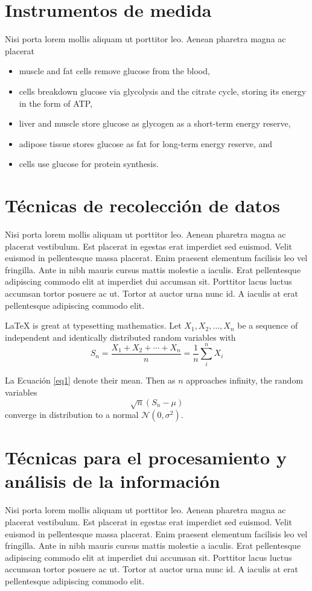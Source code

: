 \section{Instrumentos de medida}
Nisi porta lorem mollis aliquam ut porttitor leo. Aenean pharetra magna ac placerat \begin{itemize}
	\item muscle and fat cells remove glucose from the blood,
	\item cells breakdown glucose via glycolysis and the citrate cycle, storing its energy in the form of ATP,
	\item liver and muscle store glucose as glycogen as a short-term energy reserve,
	\item adipose tissue stores glucose as fat for long-term energy reserve, and
	\item cells use glucose for protein synthesis.
\end{itemize}

\section{Técnicas de recolección de datos}
Nisi porta lorem mollis aliquam ut porttitor leo. Aenean pharetra magna ac placerat vestibulum. Est placerat in egestas erat imperdiet sed euismod. Velit euismod in pellentesque massa placerat. Enim praesent elementum facilisis leo vel fringilla. Ante in nibh mauris cursus mattis molestie a iaculis. Erat pellentesque adipiscing commodo elit at imperdiet dui accumsan sit. Porttitor lacus luctus accumsan tortor posuere ac ut. Tortor at auctor urna nunc id. A iaculis at erat pellentesque adipiscing commodo elit.

\LaTeX{} is great at typesetting mathematics. Let $X_1, X_2, \ldots, X_n$ be a sequence of independent and identically distributed random variables with
\begin{equation}
	S_n = \frac{X_1 + X_2 + \cdots + X_n}{n}
	= \frac{1}{n}\sum_{i}^{n} X_i
	\label{eq1}
\end{equation}

La Ecuación \ref{eq1} denote their mean. Then as $n$ approaches infinity, the random variables $$\sqrt{n}(S_n - \mu)$$ converge in distribution to a normal $\mathcal{N}(0, \sigma^2)$.

\section{Técnicas para el procesamiento y análisis de la información}
Nisi porta lorem mollis aliquam ut porttitor leo. Aenean pharetra magna ac placerat vestibulum. Est placerat in egestas erat imperdiet sed euismod. Velit euismod in pellentesque massa placerat. Enim praesent elementum facilisis leo vel fringilla. Ante in nibh mauris cursus mattis molestie a iaculis. Erat pellentesque adipiscing commodo elit at imperdiet dui accumsan sit. Porttitor lacus luctus accumsan tortor posuere ac ut. Tortor at auctor urna nunc id. A iaculis at erat pellentesque adipiscing commodo elit.

